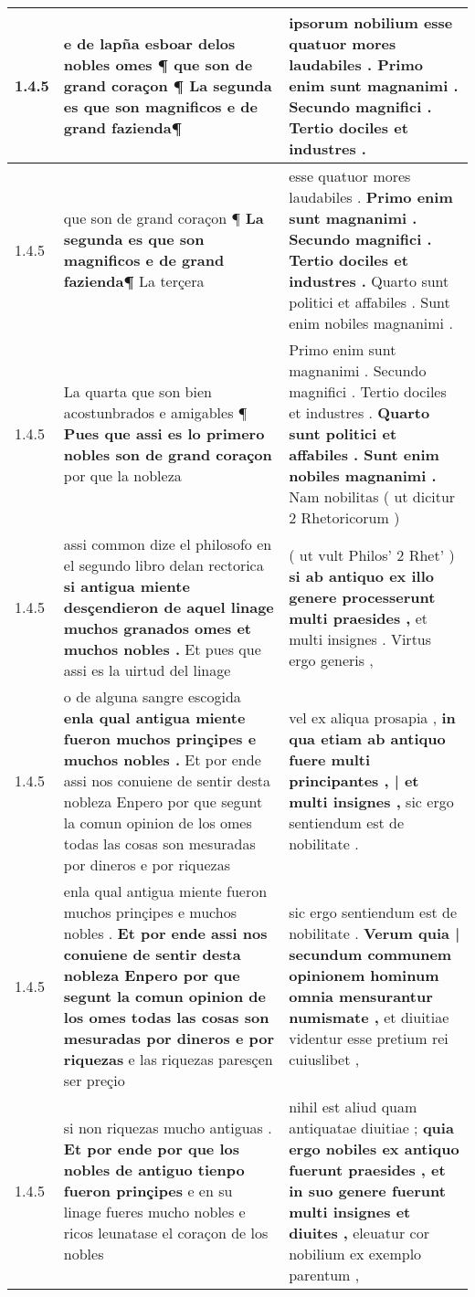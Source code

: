 \begin{tabular}{|p{1cm}|p{6.5cm}|p{6.5cm}|}
1.4.5 & e de lapña esboar delos nobles omes ¶ \textbf{ que son de grand coraçon ¶ } La segunda es que son magnificos e de grand fazienda¶ & ipsorum nobilium \textbf{ esse quatuor mores laudabiles . } Primo enim sunt magnanimi . Secundo magnifici . Tertio dociles et industres . \\\hline
1.4.5 & que son de grand coraçon ¶ \textbf{ La segunda es que son magnificos e de grand fazienda¶ } La terçera & esse quatuor mores laudabiles . \textbf{ Primo enim sunt magnanimi . Secundo magnifici . Tertio dociles et industres . } Quarto sunt politici et affabiles . Sunt enim nobiles magnanimi . \\\hline
1.4.5 & La quarta que son bien acostunbrados e amigables ¶ \textbf{ Pues que assi es lo primero nobles son de grand coraçon } por que la nobleza & Primo enim sunt magnanimi . Secundo magnifici . Tertio dociles et industres . \textbf{ Quarto sunt politici et affabiles . Sunt enim nobiles magnanimi . } Nam nobilitas ( ut dicitur 2 Rhetoricorum ) \\\hline
1.4.5 & assi common dize el philosofo en el segundo libro delan rectorica \textbf{ si antigua miente desçendieron de aquel linage muchos granados omes et muchos nobles . } Et pues que assi es la uirtud del linage & ( ut vult Philos’ 2 Rhet’ ) \textbf{ si ab antiquo ex illo genere processerunt multi praesides , } et multi insignes . Virtus ergo generis , \\\hline
1.4.5 & o de alguna sangre escogida \textbf{ enla qual antigua miente fueron muchos prinçipes e muchos nobles . } Et por ende assi nos conuiene de sentir desta nobleza Enpero por que segunt la comun opinion de los omes todas las cosas son mesuradas por dineros e por riquezas & vel ex aliqua prosapia , \textbf{ in qua etiam ab antiquo fuere multi principantes , | et multi insignes , } sic ergo sentiendum est de nobilitate . \\\hline
1.4.5 & enla qual antigua miente fueron muchos prinçipes e muchos nobles . \textbf{ Et por ende assi nos conuiene de sentir desta nobleza Enpero por que segunt la comun opinion de los omes todas las cosas son mesuradas por dineros e por riquezas } e las riquezas paresçen ser preçio & sic ergo sentiendum est de nobilitate . \textbf{ Verum quia | secundum communem opinionem hominum omnia mensurantur numismate , } et diuitiae videntur esse pretium rei cuiuslibet , \\\hline
1.4.5 & si non riquezas mucho antiguas . \textbf{ Et por ende por que los nobles de antiguo tienpo fueron prinçipes } e en su linage fueres mucho nobles e ricos leunatase el coraçon de los nobles & nihil est aliud quam antiquatae diuitiae ; \textbf{ quia ergo nobiles ex antiquo fuerunt praesides , et in suo genere fuerunt multi insignes et diuites , } eleuatur cor nobilium ex exemplo parentum , \\\hline

\end{tabular}
